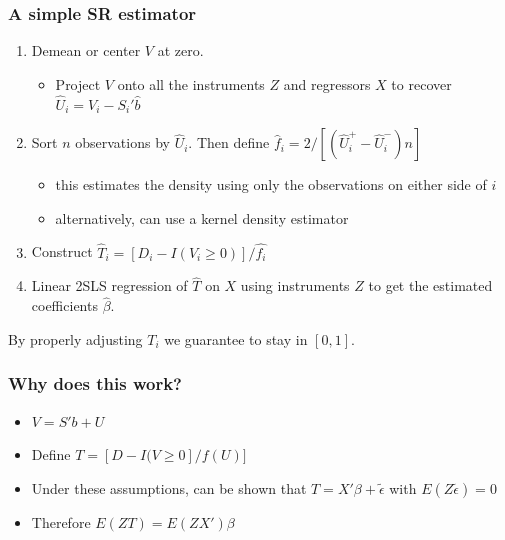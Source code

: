\begin{frame}
       \frametitle{A simple SR estimator}
       \begin{enumerate}
       \item Demean or center $V$ at zero. 
       \begin{itemize}
              \item Project $V$ onto all the instruments $Z$ and regressors $X$ to recover $\hat U_i = V_i - S_i'\hat b$  
       \end{itemize}
       \item Sort $n$ observations by $\hat U_i$. Then define $\hat f_i = 2/ \left[(\hat U_i^+ - \hat U_i^-) n \right]$ 
       \begin{itemize}
              \item this estimates the density using only the observations on either side of $i$
              \item alternatively, can use a kernel density estimator
       \end{itemize}
       \item Construct $\hat{T}_i = [D_i -  I(V_i \geq 0)]/ \hat{f_i}$
       \item Linear 2SLS regression of $\hat{T}$ on $X$ using instruments $Z$ to get the estimated coefficients $\hat{\beta}$.
       \end{enumerate}
       By properly adjusting $T_i$ we guarantee to stay in $[0,1]$.
\end{frame}
       
\begin{frame}
       \frametitle{Why does this work?}
       \begin{itemize}
       \item $V = S'b + U$ 
       \item Define $T = [ D - I(V \ge 0 ]/f(U) ] $
       \item Under these assumptions, can be shown that $T = X'\beta + \tilde \epsilon $ with $E(Z \tilde \epsilon) = 0$
       \item Therefore $E(ZT) = E(ZX')\beta$ 
       \end{itemize}
\end{frame}


